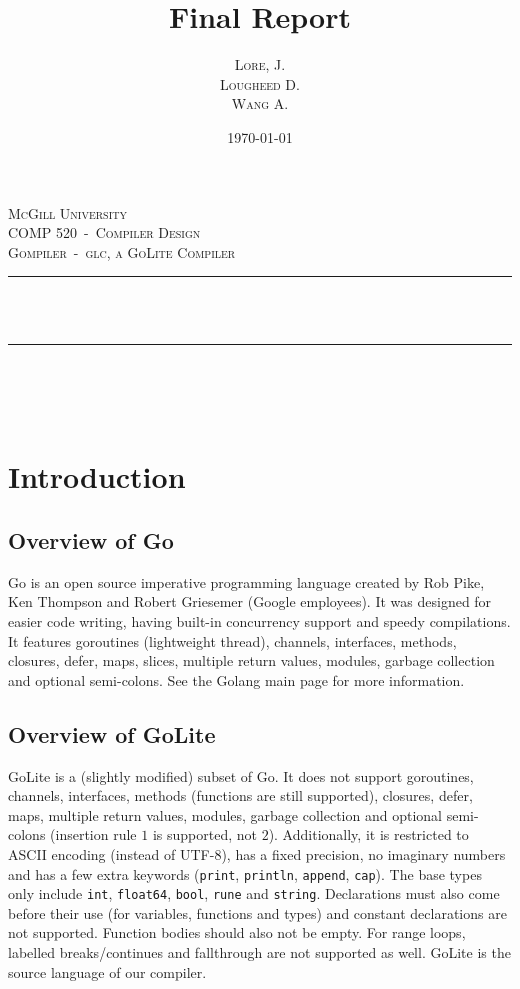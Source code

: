 \documentclass[11pt]{article}
\author{\textsc{Lore}, J.\\ \textsc{Lougheed} D.\\ \textsc{Wang} A.}
\date{\today}
\title{Final Report}
\newcommand{\HRule}{\rule{\linewidth}{0.5mm}}
\begin{document}
\begin{titlepage}
  \center%

  \textsc{\LARGE McGill University}\\[1.5cm]
  \textsc{\Large COMP 520~-~Compiler Design}\\[0.5cm]
  \textsc{\large Gompiler~-~glc, a GoLite Compiler}\\[0.5cm]

  \HRule~\\[0.4cm]
  { \huge \bfseries \thetitle}\\[0.4cm]
  \HRule~\\[1.5cm]

  \theauthor\\%
  [3cm]

  {\large \thedate}\\[2cm]

  \vfill

\end{titlepage}
\tableofcontents
\newpage
\section{Introduction}
\subsection{Overview of Go}
Go\cite{goliteinfo} is an open source imperative programming language created by Rob Pike, Ken
Thompson and Robert Griesemer (Google employees). It was designed for
easier code writing, having built-in concurrency support and speedy
compilations. It features goroutines (lightweight thread), channels,
interfaces, methods, closures, defer, maps, slices, multiple return
values, modules, garbage collection and optional semi-colons. See the
Golang main page\cite{golang} for more information.
\subsection{Overview of GoLite}
GoLite\cite{goliteinfo} is a (slightly modified) subset of Go. It does not support
goroutines, channels, interfaces, methods (functions are still
supported), closures, defer, maps, multiple return values, modules,
garbage collection and optional semi-colons (insertion
rule\cite{gospec:semicolon} $1$ is supported, not $2$). Additionally,
it is restricted to ASCII encoding (instead of UTF-8), has a fixed
precision, no imaginary numbers and has a few extra keywords
(\texttt{print}, \texttt{println}, \texttt{append}, \texttt{cap}). The
base types only include \texttt{int}, \texttt{float64}, \texttt{bool},
\texttt{rune} and \texttt{string}. Declarations must also come before
their use (for variables, functions and types) and constant
declarations are not supported. Function bodies should also not be
empty. For range loops, labelled breaks/continues and fallthrough are
not supported as well. GoLite is the source language of our compiler.
\end{document}
